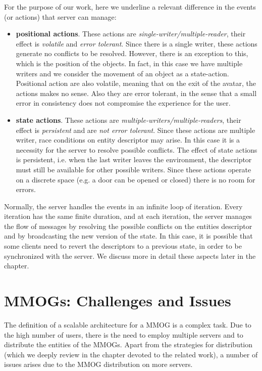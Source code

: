\documentclass[final,10pt,a5paper]{phdimt}
\theoremstyle{definition}
\begin{document}
For the purpose of our work, here we underline a relevant difference in the events (or actions) that server can manage:
\begin{itemize}
\item \textbf{positional actions}. These actions are \textit{single-writer/multiple-reader}, their effect is \textit{volatile} and \textit{error tolerant}.
Since there is a single writer, these actions generate no conflicts to be resolved. However, there is an exception to this, which is the position of the objects. In fact, in this case we have multiple writers and we consider the movement of an object as a state-action.
Positional action are also volatile, meaning that on the exit of the avatar, the actions makes no sense.
Also they are error tolerant, in the sense that a small error in consistency does not compromise the experience for the user.

\item \textbf{state actions}. These actions are \textit{multiple-writers/multiple-readers}, their effect is \textit{persistent} and are \textit{not error tolerant}.
Since these actions are multiple writer, race conditions on entity descriptor may arise. In this case it is a necessity for the server to resolve possible conflicts. The effect of state actions is persistent, i.e. when the last writer leaves the environment, the descriptor must still be available for other possible writers. Since these actions operate on a discrete space (e.g. a door can be opened or closed) there is no room for errors.

\end{itemize}




Normally, the server handles the events in an infinite loop of iteration.
Every iteration has the same finite duration, and at each iteration, the server manages the flow of messages by resolving the possible conflicts on the entities descriptor and by broadcasting the new version of the state.
In this case, it is possible that some clients need to revert the descriptors to a previous state, in order to be synchronized with the server. We discuss more in detail these aspects later in the chapter.



\section{MMOGs: Challenges and Issues}

The definition of a scalable architecture for a MMOG is a complex task.
Due to the high number of users, there is the need to employ multiple servers and to distribute the entities of the MMOGs.
Apart from the strategies for distribution (which we deeply review in the chapter devoted to the related work), a number of issues arises due to the MMOG distribution on more servers.
\end{document}
